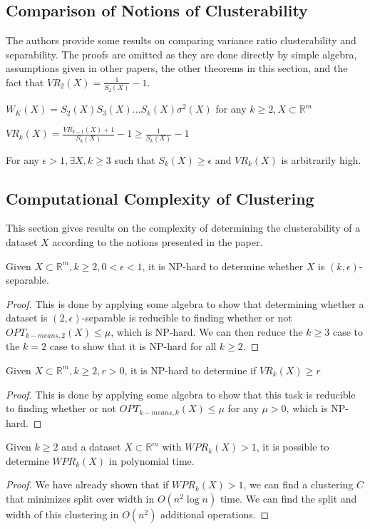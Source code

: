     \subsection*{Comparison of Notions of Clusterability}
    The authors provide some results on comparing variance ratio clusterability and separability. The proofs are omitted as they are done directly by simple algebra, assumptions given in other papers, the other theorems in this section, and the fact that $VR_2(X) = \frac{1}{S_2(X)}-1$.
    \begin{theorem}
    $W_K(X) = S_2(X)S_3(X)...S_k(X)\sigma^2(X)$ for any $k\geq 2, X\subset \mathbb{R}^m$
    \end{theorem}
    \begin{theorem}
    $VR_k(X) = \frac{VR_{k-1}(X)+1}{S_k(X)}-1 \geq \frac{1}{S_k(X)}-1$ 
    \end{theorem}
    \begin{theorem}
    For any $\epsilon>1, \exists X,k\geq 3$ such that $S_k(X) \geq \epsilon$ and $VR_k(X)$ is arbitrarily high.
    \end{theorem}
    
    \subsection*{Computational Complexity of Clustering}
    This section gives results on the complexity of determining the clusterability of a dataset $X$ according to the notions presented in the paper.
    \begin{theorem}
    Given $X\subset \mathbb{R}^m, k\geq 2, 0<\epsilon <1$, it is NP-hard to determine whether $X$ is $(k,\epsilon)$-separable.
    \end{theorem}
    \begin{proof}
        This is done by applying some algebra to show that determining whether a dataset is $(2,\epsilon)$-separable is reducible to finding whether or not $OPT_{k-means, 2}(X)\leq \mu$, which is NP-hard. We can then reduce the $k\geq 3$ case to the $k=2$ case to show that it is NP-hard for all $k\geq 2$.
    \end{proof}
    
    \begin{theorem}
    Given $X\subset \mathbb{R}^m, k\geq 2, r>0$, it is NP-hard to determine if $VR_k(X) \geq r$
    \end{theorem}
    \begin{proof}
        This is done by applying some algebra to show that this task is reducible to finding whether or not $OPT_{k-means, k}(X)\leq \mu$ for any $\mu>0$, which is NP-hard.
    \end{proof}
    
    \begin{theorem}
    Given $k\geq 2$ and a dataset $X\subset \mathbb{R}^m$ with $WPR_k(X)>1$, it is possible to determine $WPR_k(X)$ in polynomial time.
    \end{theorem}
    \begin{proof}
        We have already shown that if $WPR_k(X)>1$, we can find a clustering $C$ that minimizes split over width in $O(n^2 \log n)$ time. We can find the split and width of this clustering in $O(n^2)$ additional operations.
    \end{proof}